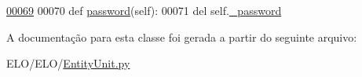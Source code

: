 \begin{DoxyCode}
\hypertarget{classELO_1_1EntityUnit_1_1User_l00069}{}\hyperlink{classELO_1_1EntityUnit_1_1User_a01ae16d257db991dd048c84dba5034c0}{00069} 
00070     \textcolor{keyword}{def }\hyperlink{classELO_1_1EntityUnit_1_1User_a01ae16d257db991dd048c84dba5034c0}{password}(self):
00071         del self.\hyperlink{classELO_1_1EntityUnit_1_1User_a084a787c085aa13221a2c3b08132a0b5}{\_password}

\end{DoxyCode}


A documentação para esta classe foi gerada a partir do seguinte arquivo\-:\begin{DoxyCompactItemize}
\item 
E\-L\-O/\-E\-L\-O/\hyperlink{EntityUnit_8py}{Entity\-Unit.\-py}\end{DoxyCompactItemize}
